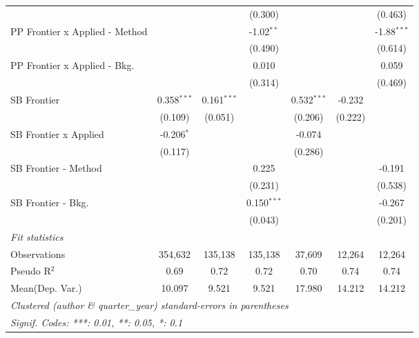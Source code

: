 \begin{tabular}{lcccccc}
                                  &                &               & (0.300)        &               &         & (0.463)\\   
   PP Frontier x Applied - Method &                &               & -1.02$^{**}$   &               &         & -1.88$^{***}$\\   
                                  &                &               & (0.490)        &               &         & (0.614)\\   
   PP Frontier x Applied - Bkg.   &                &               & 0.010          &               &         & 0.059\\   
                                  &                &               & (0.314)        &               &         & (0.469)\\   
   SB Frontier                    & 0.358$^{***}$  & 0.161$^{***}$ &                & 0.532$^{***}$ & -0.232  &   \\   
                                  & (0.109)        & (0.051)       &                & (0.206)       & (0.222) &   \\   
   SB Frontier x Applied          & -0.206$^{*}$   &               &                & -0.074        &         &   \\   
                                  & (0.117)        &               &                & (0.286)       &         &   \\   
   SB Frontier - Method           &                &               & 0.225          &               &         & -0.191\\   
                                  &                &               & (0.231)        &               &         & (0.538)\\   
   SB Frontier - Bkg.             &                &               & 0.150$^{***}$  &               &         & -0.267\\   
                                  &                &               & (0.043)        &               &         & (0.201)\\   
   \midrule
   \emph{Fit statistics}\\
   Observations                   & 354,632        & 135,138       & 135,138        & 37,609        & 12,264  & 12,264\\  
   Pseudo R$^2$                   & 0.69           & 0.72          & 0.72           & 0.70          & 0.74    & 0.74\\  
Mean(Dep. Var.) & 10.097 & 9.521 & 9.521 & 17.980 & 14.212 & 14.212 \\
   \midrule \midrule
   \multicolumn{7}{l}{\emph{Clustered (author \& quarter\_year) standard-errors in parentheses}}\\
   \multicolumn{7}{l}{\emph{Signif. Codes: ***: 0.01, **: 0.05, *: 0.1}}\\
\end{tabular}
\par\endgroup
